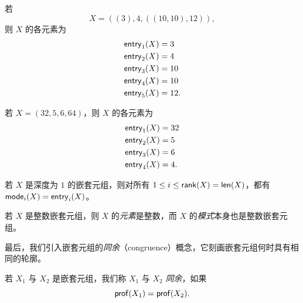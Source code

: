 \begin{example}
    若
    \[X = ((3),4,((10,10),12)),\]
    则 $X$ 的各元素为
    \begin{align*}
        \mathsf{entry}_1(X) & = 3\\
        \mathsf{entry}_2(X) & = 4\\
        \mathsf{entry}_3(X) & = 10\\
        \mathsf{entry}_4(X) & = 10\\
        \mathsf{entry}_5(X) & = 12.
    \end{align*}
\end{example}

\begin{example}
    若 $X = (32,5,6,64)$，则 $X$ 的各元素为
    \begin{align*}
        \mathsf{entry}_1(X) & = 32\\
        \mathsf{entry}_2(X) & = 5\\
        \mathsf{entry}_3(X) & = 6\\
        \mathsf{entry}_4(X) & = 4.
    \end{align*}
\end{example}

\begin{example}
    若 $X$ 是深度为 $1$ 的嵌套元组，则对所有 $1 \leq i \leq \mathsf{rank}(X) = \mathsf{len}(X)$，都有 $\mathsf{mode}_i(X) = \mathsf{entry}_i(X)$。
\end{example}

\begin{observation}
    若 $X$ 是整数嵌套元组，则 $X$ 的{\it 元素}是整数，而 $X$ 的{\it 模式}本身也是整数嵌套元组。
\end{observation}

最后，我们引入嵌套元组的{\it 同余}（congruence）概念，它刻画嵌套元组何时具有相同的轮廓。

\begin{definition}
    若 $X_1$ 与 $X_2$ 是嵌套元组，我们称 $X_1$ 与 $X_2$ {\it 同余}，如果
    \[
    \mathsf{prof}(X_1) = \mathsf{prof}(X_2).
    \]
\end{definition}



